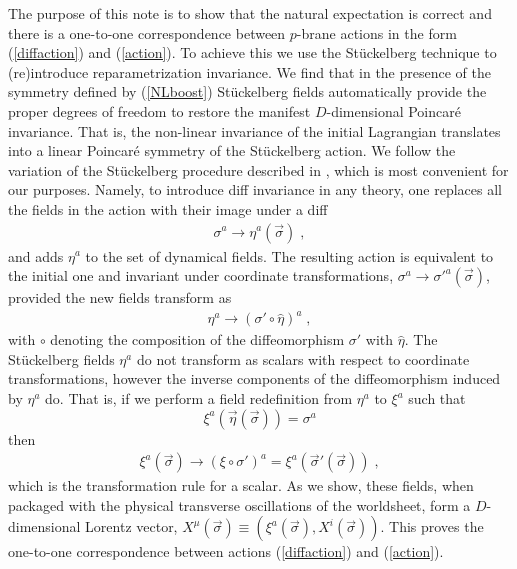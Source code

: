 \documentclass[%
 reprint,
 amsmath,amssymb,
 aps,
]{revtex4-1}
\begin{document}
The purpose of this note is to show that the natural expectation is correct and there is a one-to-one correspondence between $p$-brane actions
in the form (\ref{diffaction}) and (\ref{action}).
To achieve this we use the St\"uckelberg technique
to (re)introduce reparametrization invariance.
 We find that in the presence of the symmetry defined by (\ref{NLboost}) St\"uckelberg fields automatically provide the proper degrees of freedom to restore the
manifest $D$-dimensional Poincar\'e invariance. That is, the non-linear invariance of the initial
Lagrangian translates into a linear Poincar\'e symmetry of the St\"uckelberg action.
We follow the variation of the St\"uckelberg procedure described in
\cite{Dubovsky:2004sg}, which is most convenient for our purposes.
Namely, to introduce  diff invariance in any theory, one
replaces all the fields in the action with their image under a diff
\begin{eqnarray}
    \sigma^{a} \rightarrow \eta^{a}(\vec{\sigma}) \; , \nonumber
\end{eqnarray}
and adds $\eta^a$ to the set of dynamical fields. The resulting action is equivalent to the initial one and invariant under
coordinate transformations, $\sigma^a \rightarrow \sigma'^a(\vec{\sigma})$, provided the new fields transform as
\begin{eqnarray}
    \eta^{a} \rightarrow \left( \sigma' \circ \hat{\eta} \right)^{a} \; , \nonumber
\end{eqnarray}
with $\circ$ denoting the composition of the diffeomorphism $\sigma'$ with $\hat{\eta}$.
The St\"uckelberg fields $\eta^a$  do not transform as scalars with respect to coordinate transformations,
however  the inverse components of the diffeomorphism induced by $\eta^a$ do.  That is,
if we perform a field redefinition from $\eta^a$ to $\xi^{a}$ such that
\begin{equation}
\label{etadef}
\xi^{a}(\vec{\eta}(\vec{\sigma})) = \sigma^{a}
\end{equation}
 then
\begin{eqnarray}
    \xi^{a}(\vec{\sigma}) \rightarrow \left( \xi \circ \sigma' \right)^{a} = \xi^a(\vec{\sigma}'(\vec{\sigma})) \nonumber \; ,
\end{eqnarray}
which is the transformation rule for a scalar.
As we show, these fields, when packaged with the physical transverse oscillations
of the worldsheet, form a $D$-dimensional Lorentz vector,
$X^{\mu}(\vec{\sigma}) \equiv (\xi^a(\vec{\sigma}),X^i(\vec{\sigma}))$.
This proves the one-to-one correspondence between actions (\ref{diffaction}) and (\ref{action}).
\end{document}
